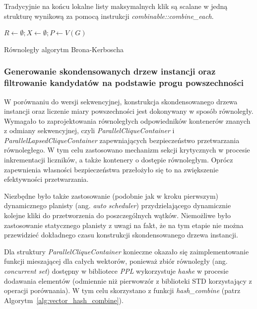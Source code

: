 \documentclass[12pt]{article}
\begin{document}
Tradycyjnie na końcu lokalne listy maksymalnych klik są scalane w jedną strukturę wynikową za pomocą instrukcji \textit{combinable::combine\_each}.
\begin{algorithm}

$R \leftarrow \emptyset; X \leftarrow \emptyset; P \leftarrow V(G)$\;
\caption{Równoległy algorytm Brona-Kerboscha}
\label{alg:bk3}
\end{algorithm}

 
\subsubsection{Generowanie skondensowanych drzew instancji oraz filtrowanie kandydatów na podstawie progu powszechności}

W porównaniu do wersji sekwencyjnej, konstrukcja skondensowanego drzewa instancji oraz liczenie miary powszechności jest dokonywany w sposób równoległy. Wymagało to zaprojektowania równoległych odpowiedników kontenerów znanych z odmiany sekwencyjnej, czyli \textit{ParallelCliqueContainer} i \textit{ParallelLapsedCliqueContainer} zapewniających bezpieczeństwo przetwarzania równoległego. W tym celu zastosowano mechanizm sekcji krytycznych w procesie inkrementacji liczników, a także kontenery o dostępie równoległym. Oprócz zapewnienia własności bezpieczeństwa przełożyło się to na zwiększenie efektywności przetwarzania.

Niezbędne było także zastosowanie (podobnie jak w kroku pierwszym) dynamicznego planisty (ang. \textit{auto scheduler}) przydzielającego dynamicznie kolejne kliki do przetworzenia do poszczególnych wątków. Niemożliwe było zastosowanie statycznego planisty z uwagi na fakt, że na tym etapie nie można przewidzieć dokładnego czasu konstrukcji skondensowanego drzewa instancji.

Dla struktury \textit{ParallelCliqueContainer} konieczne okazało się zaimplementowanie funkcji mieszającej dla całych wektorów, ponieważ zbiór równoległy (ang. \textit{concurrent set}) dostępny w bibliotece \textit{PPL} wykorzystuje \textit{hashe} w procesie dodawania elementów (odmiennie niż pierwowzór z biblioteki STD korzystający z operacji porównania). W tym celu skorzystano z funkcji \textit{hash\_combine} (patrz Algorytm~\ref{alg:vector_hash_combine}).
\end{document}
